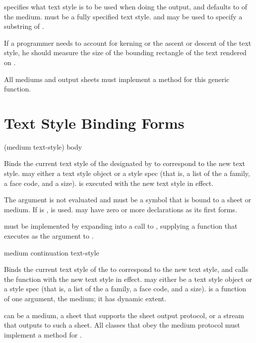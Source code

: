  specifies what text style is to be used when doing the output,
and defaults to  of the medium.  
must be a fully specified text style.   and  may be used to
specify a substring of .

If a programmer needs to account for kerning or the ascent or descent of the
text style, he should measure the size of the bounding rectangle of the text
rendered on .

All mediums and output sheets must implement a method for this generic function.


\section {Text Style Binding Forms}

 {(medium text-style) \body body}

Binds the current text style of the  designated by  to
correspond to the new text style.   may either a text style
object or a style spec (that is, a list of the a family, a face code, and a
size).   is executed with the new text style in effect.

The  argument is not evaluated and must be a symbol that is bound
to a sheet or medium.  If  is ,  is
used.   may have zero or more declarations as its first forms.

 must be implemented by expanding into a call to
, supplying a function that executes  as
the  argument to .

 {medium continuation text-style}

Binds the current text style of the   to correspond to
the new text style, and calls the function  with the new text
style in effect.   may either be a text style object or a style
spec (that is, a list of the a family, a face code, and a size).  
is a function of one argument, the medium; it has dynamic extent.

 can be a medium, a sheet that supports the sheet output protocol,
or a stream that outputs to such a sheet.  All classes that obey the medium
protocol must implement a method for .


